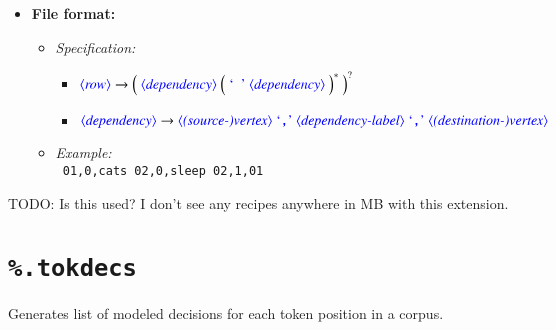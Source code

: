 \documentclass[12pt]{report}
\def\blue{\color{blue}}
\def\magenta{\color{magenta}}
\begin{document}
\begin{itemize}
      \item \textbf{File format:}
      \begin{itemize}
            \item \textit{Specification:}
            \begin{itemize}
                  \item {\small $\dtype{row}        \rightarrow \Big( \ \dtype{dependency} \ \Big( \ \dcode{\ } \ \dtype{dependency} \ \Big)^* \ \Big)^?$}
                  \item {\small $\dtype{dependency} \rightarrow \dtype{(source-)vertex} \ \dcode{,} \ \dtype{dependency-label} \ \dcode{,} \ \dtype{(destination-)vertex}$}
            \end{itemize}
            \item \textit{Example:}\\
            {\magenta\tt
            01,0,cats 02,0,sleep 02,1,01
            }
      \end{itemize}
\end{itemize}

TODO: Is this used? I don't see any recipes anywhere in MB with this extension.

\section{{\blue\tt \%.tokdecs}}

Generates list of modeled decisions for each token position in a corpus.
\end{document}
